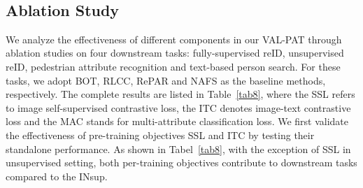 \documentclass[final]{cvpr}
\begin{document}
\begin{table}[t]
\small
\centering
{}\\
\caption{Performance (\%) comparisons with state-of-the-art pedestrian attribute recognition approaches on PA-100K. }
\label{tab6}
\vspace{-4mm}
\end{table}



\subsection{Ablation Study}
We analyze the effectiveness of different components in our VAL-PAT through ablation studies on four downstream tasks: fully-supervised reID, unsupervised reID, pedestrian attribute recognition and text-based person search.
For these tasks, we adopt BOT, RLCC, RePAR and NAFS as the baseline methods, respectively. 
The complete results are listed in Table~\ref{tab8}, where the SSL refers to image self-supervised contrastive loss, the ITC denotes image-text contrastive loss and the MAC stands for multi-attribute classification loss.
We first validate the effectiveness of pre-training objectives SSL and ITC by testing their standalone performance.
As shown in Tabel~\ref{tab8}, with the exception of SSL in unsupervised setting, both per-training objectives contribute to downstream tasks compared to the INsup.
\end{document}
